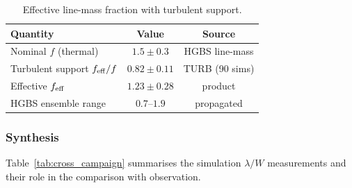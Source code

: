 \documentclass[usenatbib,twoside,twocolumn]{mnras}
\begin{document}
\begin{table}
\caption{Effective line-mass fraction with turbulent support.}
\label{tab:feff}
\footnotesize
\setlength{\tabcolsep}{4pt}
\begin{tabular}{p{3.0cm}cc}
\toprule
Quantity & Value & Source \\
\midrule
Nominal $f$ (thermal) & $1.5 \pm 0.3$ & HGBS line-mass \\
Turbulent support $f_{\rm eff}/f$ & $0.82 \pm 0.11$ & TURB (90 sims) \\
Effective $f_{\rm eff}$ & $1.23 \pm 0.28$ & product \\
HGBS ensemble range & $0.7$--$1.9$ & propagated \\
\bottomrule
\end{tabular}
\end{table}

\subsubsection{Synthesis}

Table~\ref{tab:cross_campaign} summarises the simulation $\lambda/W$ measurements and their role in the comparison with observation.
\end{document}
